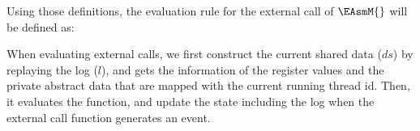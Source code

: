 Using those definitions, the evaluation rule for the external call of $\EAsmM{}$ will be defined as:
\begin{small}
\begin{mathpar}
\end{mathpar}
\end{small}
When evaluating external calls, 
we first construct the current shared data ($ds$) by replaying the log ($l$), 
and gets the information of the register values and the private abstract data that are mapped with the current 
running thread id.
Then, it evaluates the function, and update the state 
including the log when the external call function generates an event.

